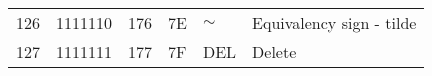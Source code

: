 \begin{center}
\begin{longtable}{llllll}
\rowcolor[HTML]{F3F6F6} 
{\color[HTML]{404040} 126}              & {\color[HTML]{404040} 1111110}         & {\color[HTML]{404040} 176}            & {\color[HTML]{404040} 7E}                   & {\color[HTML]{404040} $\sim$}             & {\color[HTML]{404040} Equivalency sign - tilde}              \\
\rowcolor[HTML]{FCFCFC} 
{\color[HTML]{404040} 127}              & {\color[HTML]{404040} 1111111}         & {\color[HTML]{404040} 177}            & {\color[HTML]{404040} 7F}                   & {\color[HTML]{404040} DEL}                & {\color[HTML]{404040} Delete}                               
\end{longtable}
\label{ascii}
\end{center}